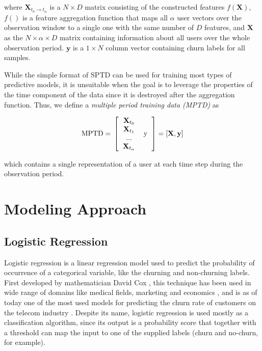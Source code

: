 \documentclass{kththesis}
\begin{document}
where $\mathbf{X}_{t_0\rightarrow t_\alpha}$ is a $N \times D$ matrix consisting of the constructed features $f(\mathbf{X})$, $f()$ is a feature aggregation function that maps all $\alpha$ user vectors over the observation window to a single one with the same number of $D$ features, and  $\mathbf{X}$ as the $N \times \alpha \times D$ matrix containing information about all users over the whole observation period. $\mathbf{y}$ is a $1 \times N$ column vector containing churn labels for all samples. 

While the simple format of SPTD can be used for training most types of predictive models, it is unsuitable when the goal is to leverage the properties of the time component of the data since it is destroyed after the aggregation function. Thus, we define a \emph{multiple period training data (MPTD)} as

\begin{equation}
\text{MPTD} = \\
\left [  
  \begin{tabular}{c c}
   $\mathbf{X}_{t_0}$   & \multirow{4}{*}{y} \\
   $\mathbf{X}_{t_1}$ \\
   ... \\
  $\mathbf{X}_{t_\alpha}$ \\
  \end{tabular}
\right ]
= [\mathbf{X}, \mathbf{y}]
\end{equation}

which contains a single representation of a user at each time step during the observation period.

\section{Modeling Approach}

\subsection{Logistic Regression}

Logistic regression is a linear regression model used to predict the probability of occurrence of a categorical variable, like the churning and non-churning labels. First developed by mathematician David Cox \citep{cox1958regression}, this technique has been used in wide range of domains like medical fields, marketing and economics , and is as of today one of the most used models for predicting the churn rate of customers on the telecom industry \citep{mahajan2015review}. Despite its name, logistic regression is used mostly as a classification algorithm, since its output is a probability score that together with a threshold can map the input to one of the supplied labels (churn and no-churn, for example).
\end{document}
